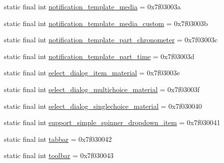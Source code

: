 \begin{CompactItemize}
\item 
static final int \hyperlink{classandroid_1_1support_1_1mediacompat_1_1_r_1_1layout_ca01518cc50eb6de97f945850384706a}{notification\_\-template\_\-media} = 0x7f03003a
\item 
static final int \hyperlink{classandroid_1_1support_1_1mediacompat_1_1_r_1_1layout_275a2d6acc799018f01463d369320054}{notification\_\-template\_\-media\_\-custom} = 0x7f03003b
\item 
static final int \hyperlink{classandroid_1_1support_1_1mediacompat_1_1_r_1_1layout_0f17fbec182858a4dbee50d374acf700}{notification\_\-template\_\-part\_\-chronometer} = 0x7f03003c
\item 
static final int \hyperlink{classandroid_1_1support_1_1mediacompat_1_1_r_1_1layout_61a460e5e7146a85dc89cb44ef3aa946}{notification\_\-template\_\-part\_\-time} = 0x7f03003d
\item 
static final int \hyperlink{classandroid_1_1support_1_1mediacompat_1_1_r_1_1layout_60f4f7f1542eb619c3f24daf0eb5941e}{select\_\-dialog\_\-item\_\-material} = 0x7f03003e
\item 
static final int \hyperlink{classandroid_1_1support_1_1mediacompat_1_1_r_1_1layout_9d59ca2ad9a2f9b983882ae65048fd55}{select\_\-dialog\_\-multichoice\_\-material} = 0x7f03003f
\item 
static final int \hyperlink{classandroid_1_1support_1_1mediacompat_1_1_r_1_1layout_d98a49a065cf7d73238758e6d94d1877}{select\_\-dialog\_\-singlechoice\_\-material} = 0x7f030040
\item 
static final int \hyperlink{classandroid_1_1support_1_1mediacompat_1_1_r_1_1layout_4de3d461ac0665da777489cfa80ee63a}{support\_\-simple\_\-spinner\_\-dropdown\_\-item} = 0x7f030041
\item 
static final int \hyperlink{classandroid_1_1support_1_1mediacompat_1_1_r_1_1layout_5e658ca4824c5ed9ed8f9b3cf1aed3c1}{tabbar} = 0x7f030042
\item 
static final int \hyperlink{classandroid_1_1support_1_1mediacompat_1_1_r_1_1layout_5e0731282ab841316f349be8c862d6bf}{toolbar} = 0x7f030043
\end{CompactItemize}


